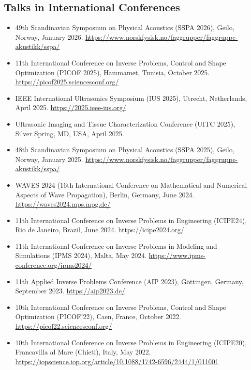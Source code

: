 \documentclass[10pt]{article}
\begin{document}
\subsection{Talks in International Conferences}
\begin{itemize}
\item 49th Scandinavian Symposium on Physical Acoustics (SSPA 2026), Geilo, Norway, January 2026. \url{https://www.norskfysisk.no/faggrupper/faggruppe-akustikk/sspa/}
\item 11th International Conference on Inverse Problems, Control and Shape Optimization (PICOF 2025), Hammamet, Tunisia, October 2025. \url{https://picof2025.sciencesconf.org/}
\item IEEE International Ultrasonics Symposium (IUS 2025), Utrecht, Netherlands, April 2025. \url{https://2025.ieee-ius.org/}
\item Ultrasonic Imaging and Tissue Characterization Conference (UITC 2025), Silver Spring, MD, USA, April 2025.
\item 48th Scandinavian Symposium on Physical Acoustics (SSPA 2025), Geilo, Norway, January 2025. \url{https://www.norskfysisk.no/faggrupper/faggruppe-akustikk/sspa/}
\item WAVES 2024 (16th International Conference on Mathematical and Numerical Aspects of Wave Propagation), Berlin, Germany, June 2024. \url{https://waves2024.mps.mpg.de/}
\item 11th International Conference on Inverse Problems in Engineering (ICIPE24), Rio de Janeiro, Brazil, June 2024. \url{https://icipe2024.org/}
\item 11th International Conference on Inverse Problems in Modeling and Simulations (IPMS 2024), Malta, May 2024. \url{https://www.ipms-conference.org/ipms2024/}
\item 11th Applied Inverse Problems Conference (AIP 2023), Göttingen, Germany, September 2023. \url{https://aip2023.de/}
\item 10th International Conference on Inverse Problems, Control and Shape Optimization (PICOF'22), Caen, France, October 2022. \url{https://picof22.sciencesconf.org/}
\item 10th International Conference on Inverse Problems in Engineering (ICIPE20), Francavilla al Mare (Chieti), Italy, May 2022. \url{https://iopscience.iop.org/article/10.1088/1742-6596/2444/1/011001}
\end{itemize}
\end{document}
